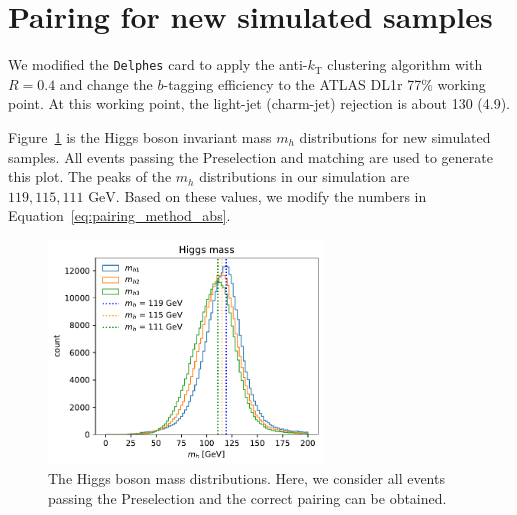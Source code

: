 \documentclass[12pt]{article}
\begin{document}
\section{Pairing for new simulated samples}%
\label{sec:pairing_for_new_simulated_samples}
    We modified the \verb|Delphes| card to apply the anti-$k_{\text{T}}$ clustering algorithm with $R = 0.4$ and change the $b$-tagging efficiency to the ATLAS DL1r 77\% working point. At this working point, the light-jet (charm-jet) rejection is about 130 (4.9).

    Figure~\ref{fig:mh_distribution_new} is the Higgs boson invariant mass $m_h$ distributions for new simulated samples. All events passing the Preselection and matching are used to generate this plot. The peaks of the $m_{h}$ distributions in our simulation are $119, 115, 111 \text{ GeV}$. Based on these values, we modify the numbers in Equation~\ref{eq:pairing_method_abs}.
	\begin{figure}[htpb] 
		\centering
        \includegraphics[width=0.65\textwidth]{mh_distribution_new.pdf}
		\caption{The Higgs boson mass distributions. Here, we consider all events passing the Preselection and the correct pairing can be obtained.}
		\label{fig:mh_distribution_new}
	\end{figure}
\end{document}

